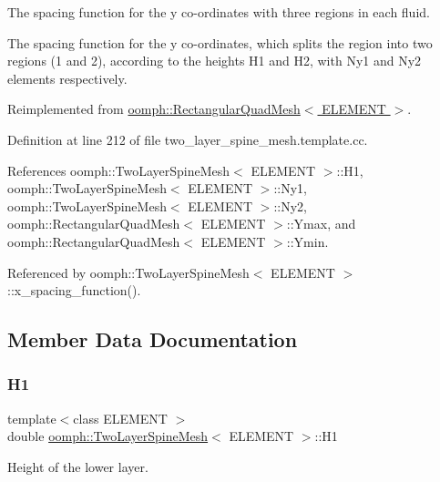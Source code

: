 The spacing function for the y co-\/ordinates with three regions in each fluid. 

The spacing function for the y co-\/ordinates, which splits the region into two regions (1 and 2), according to the heights H1 and H2, with Ny1 and Ny2 elements respectively. 

Reimplemented from \hyperlink{classoomph_1_1RectangularQuadMesh_ae78204de1f176cdf2e819673bd34e78a}{oomph\+::\+Rectangular\+Quad\+Mesh$<$ E\+L\+E\+M\+E\+N\+T $>$}.



Definition at line 212 of file two\+\_\+layer\+\_\+spine\+\_\+mesh.\+template.\+cc.



References oomph\+::\+Two\+Layer\+Spine\+Mesh$<$ E\+L\+E\+M\+E\+N\+T $>$\+::\+H1, oomph\+::\+Two\+Layer\+Spine\+Mesh$<$ E\+L\+E\+M\+E\+N\+T $>$\+::\+Ny1, oomph\+::\+Two\+Layer\+Spine\+Mesh$<$ E\+L\+E\+M\+E\+N\+T $>$\+::\+Ny2, oomph\+::\+Rectangular\+Quad\+Mesh$<$ E\+L\+E\+M\+E\+N\+T $>$\+::\+Ymax, and oomph\+::\+Rectangular\+Quad\+Mesh$<$ E\+L\+E\+M\+E\+N\+T $>$\+::\+Ymin.



Referenced by oomph\+::\+Two\+Layer\+Spine\+Mesh$<$ E\+L\+E\+M\+E\+N\+T $>$\+::x\+\_\+spacing\+\_\+function().



\subsection{Member Data Documentation}
\mbox{\label{classoomph_1_1TwoLayerSpineMesh_ad98f7a291c592042279f0498ea3ec5c9}} 
\subsubsection{\texorpdfstring{H1}{H1}}
{\footnotesize\ttfamily template$<$class E\+L\+E\+M\+E\+NT $>$ \\
double \hyperlink{classoomph_1_1TwoLayerSpineMesh}{oomph\+::\+Two\+Layer\+Spine\+Mesh}$<$ E\+L\+E\+M\+E\+NT $>$\+::H1\hspace{0.3cm}{\ttfamily [protected]}}



Height of the lower layer. 



